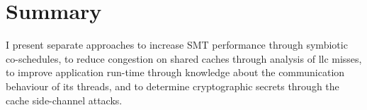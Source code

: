 \section{Summary}
\label{state:summary}

\begin{comment}
After I introduce the reader to relevant terminology, I present related
research about symbiotic \gls{smt} co-schedules and the problem of accurately
measuring the performance of a specific co-schedule.
The prime are of application for load balancing is resource congestion. Research by
\citeauthor{knauerhase_using_2008}, \citeauthor{banikazemi_pam_2008}, and
\citeauthor{zhuravlev_addressing_2012} shows that separating application
competing for cache and memory decreases and stabilises their execution times.
The research presents \gls{llc} misses of an application as indicator for
memory usage and stress put on the memory subsystem.

\cite{hofmeyr_load_2010} balances a single application with several threads.
When all threads reach a synchronization barrier and they communicate their
results.
Hence, the slowest thread lets all other threads wait.
The authors develop a model to provide each thread with equal progress
opportunity.
The knowledge of this communication relationship determines the decision of
the load balancer.

Computations are reflected in cache usage of an application.
PRIME+PROBE attacks analyse the usage of cache lines of the targeted
application and can rebuild a cryptographic secret from the observations.
Placing security critical tasks on other cores than possible attackers, reduces
the amount of cache shared, hence raises the bar for an attack.
\\

In difference to the related work, the goal in this thesis is to design and
implement a load balancer, which mainly uses online measurements to decide on a
thread-to-core mapping.
Also, it should consider communication relationships and security requirements.
While previous research uses \gls{cmp} style processors, I use a \gls{smp} type
processor.
\Gls{cmp} is more similar to a multi-socket system, due to the separated
\gls{llc} between two processors on one die.
\end{comment}

I present separate approaches to increase SMT performance through symbiotic
co-schedules, to reduce congestion on shared caches through analysis of
\gls{llc} misses, to improve application run-time through knowledge about the
communication behaviour of its threads, and to determine cryptographic secrets
through the cache side-channel attacks.

